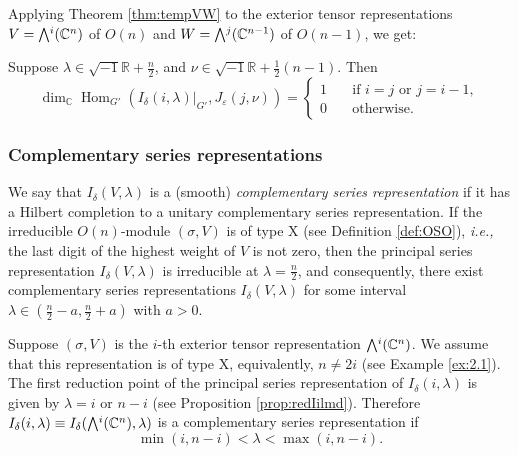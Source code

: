Applying Theorem \ref{thm:tempVW} to the exterior tensor representations
 $V=\Exterior^i({\mathbb{C}}^n)$ of $O(n)$
 and $W=\Exterior^j({\mathbb{C}}^{n-1})$ of $O(n-1)$, 
 we get:
\begin{corollary}
\label{cor:tempered}
Suppose $\lambda \in \sqrt{-1}{\mathbb{R}}+ \frac n 2$, 
 and $\nu \in \sqrt{-1}{\mathbb{R}}+\frac 1 2(n-1)$.  
Then  
\[
   \dim_{\mathbb{C}} {\operatorname{Hom}}_{G'}(I_\delta(i,\lambda)|_{G'}, J_\varepsilon (j,\nu))
=
\begin{cases}
1 \quad&\text{if $i=j$ or $j=i-1$}, 
\\
0      &\text{otherwise}.
\end{cases}
\]
\end{corollary}



\subsubsection{Complementary series representations}
\label{subsec:SBcomp}
We say that $I_\delta(V,\lambda)$ is a (smooth)
 {\it{complementary series  representation}}
 if it has a Hilbert completion
 to a unitary complementary series representation.  
If the irreducible $O(n)$-module $(\sigma,V)$ is of
 type X
 (see Definition \ref{def:OSO}), 
 {\it{i.e.,}} 
 the last digit of the highest weight of $V$ is not zero, 
 then the principal series representation 
 $I_\delta(V,\lambda)$ is irreducible at $\lambda = \frac n 2$, 
 and consequently, 
 there exist complementary series representations
 $I_\delta(V,\lambda)$
 for some interval $\lambda \in (\frac n 2-a, \frac n 2+a)$ with $a >0$.  
\begin{example}
\label{ex:Iicompl}
Suppose $(\sigma,V)$ is the $i$-th exterior tensor representation
 $\Exterior^i({\mathbb{C}}^n)$.  
We assume that this representation is of type X, 
 equivalently,
 $n \ne 2i$
 (see Example \ref{ex:2.1}).  
The first reduction point of the principal series representation
 of $I_{\delta}(i,\lambda)$ is given by $\lambda=i$ or $n-i$
 (see Proposition \ref{prop:redIilmd}).  
Therefore $I_\delta(i,\lambda) \equiv I_\delta(\Exterior^i({\mathbb{C}}^n),\lambda)$
 is a complementary series representation
 if 
\[
  {\operatorname{min}}(i,n-i) < \lambda < {\operatorname{max}}(i,n-i).  
\]
\end{example}


